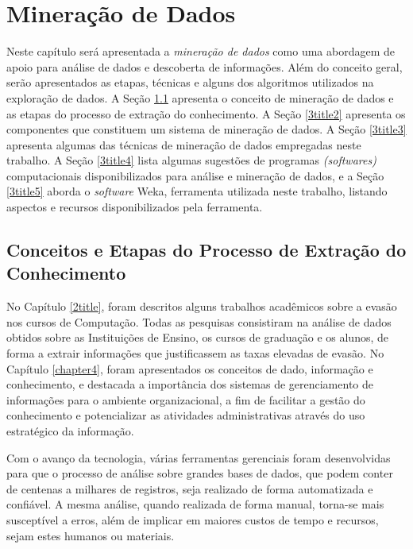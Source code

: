 
\chapter{Mineração de Dados} \label{chapter3}

Neste capítulo será apresentada a \textit{mineração de dados} como uma abordagem de apoio para análise de  dados e descoberta de informações. Além do conceito geral, serão apresentados as etapas, técnicas e alguns dos algoritmos utilizados na exploração de dados. A Seção \ref{3title1} apresenta o conceito de mineração de dados e as etapas do processo de extração do conhecimento. A Seção \ref{3title2} apresenta os componentes que constituem um sistema de mineração de dados. A Seção \ref{3title3} apresenta algumas das técnicas de mineração de dados empregadas neste trabalho. A Seção \ref{3title4} lista algumas sugestões de programas \textit{(softwares)} computacionais disponibilizados para análise e mineração de dados, e a Seção \ref{3title5} aborda o \textit{software} Weka, ferramenta utilizada neste trabalho, listando aspectos e recursos disponibilizados pela ferramenta.

\section{Conceitos e Etapas do Processo de Extração do Conhecimento} \label{3title1}

No Capítulo \ref{2title}, foram descritos alguns trabalhos acadêmicos sobre a evasão nos cursos de Computação. Todas as pesquisas consistiram na análise de dados obtidos sobre as Instituições de Ensino, os cursos de graduação e os alunos, de forma a extrair informações que justificassem as taxas elevadas de evasão. No Capítulo \ref{chapter4}, foram apresentados os conceitos de dado, informação e conhecimento, e destacada a importância dos sistemas de gerenciamento de informações para o ambiente organizacional, a fim de facilitar a gestão do conhecimento e potencializar as atividades administrativas através do uso estratégico da informação. 

Com o avanço da tecnologia, várias ferramentas gerenciais foram desenvolvidas para que o processo de análise sobre grandes bases de dados, que podem conter de centenas a milhares de registros, seja realizado de forma automatizada e confiável. A mesma análise, quando realizada de forma manual, torna-se mais susceptível a erros, além de implicar em maiores custos de tempo e recursos, sejam estes humanos ou materiais.
 
